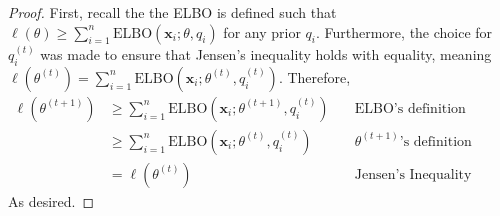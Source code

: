 \begin{proof}
    First, recall the the ELBO is defined such that $\ell(\theta) \ge \sum_{i=1}^n \text{ELBO}(\mathbf{x}_i;\theta,q_i)$ for any prior $q_i$. Furthermore, the choice for $q_i^{(t)}$ was made to ensure that Jensen's inequality holds with equality, meaning $\ell(\theta^{(t)})=\sum_{i=1}^n \text{ELBO}(\mathbf{x}_i;\theta^{(t)},q_i^{(t)})$. Therefore,
    \begin{align*}
        \ell(\theta^{(t+1)})
        &\ge \sum_{i=1}^n \text{ELBO}(\mathbf{x}_i;\theta^{(t+1)},q_i^{(t)}) &\quad\text{ELBO's definition} \\
        &\ge \sum_{i=1}^n \text{ELBO}(\mathbf{x}_i;\theta^{(t)},q_i^{(t)}) &\quad\theta^{(t+1)}\text{'s definition} \\
        &= \ell(\theta^{(t)}) &\quad\text{Jensen's Inequality Equality Case}
    \end{align*}
    As desired.
\end{proof}
